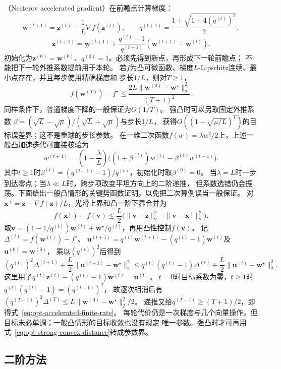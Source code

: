 （Nesterov accelerated gradient）在前瞻点计算梯度：
\[
 \bm w^{(t+1)}=\bm z^{(t)}-\frac1L\nabla f(\bm z^{(t)}),\qquad
 q^{(t+1)}=\frac{1+\sqrt{1+4(q^{(t)})^2}}2,
\]
\[
 \bm z^{(t+1)}=\bm w^{(t+1)}
 +\frac{q^{(t)}-1}{q^{(t+1)}}(\bm w^{(t+1)}-\bm w^{(t)}).
\]
初始化为$\bm z^{(0)}=\bm w^{(0)}$、$q^{(0)}=1$。必须先得到新点，再形成下一轮前瞻点；
不能把下一轮外推系数提前用于本轮。
若$f$为凸可微函数、梯度$L$-Lipschitz连续、最小点存在，并且每步使用精确梯度和
步长$1/L$，则对$T\geq1$，
\begin{equation}
 f(\bm w^{(T)})-f^\star
 \leq\frac{2L\|\bm w^{(0)}-\bm w^\star\|_2^2}{(T+1)^2}.
 \label{eq:opt-accelerated-finite-rate}
\end{equation}
同样条件下，普通梯度下降的一般保证为$O(1/T)$。
强凸时可以另取固定外推系数
$\beta=(\sqrt L-\sqrt\mu)/(\sqrt L+\sqrt\mu)$与步长$1/L$，
获得$O((1-\sqrt{\mu/L})^T)$的目标误差界；这不是重球的步长参数。
在一维二次函数$f(w)=\lambda w^2/2$上，上述一般凸加速迭代可直接核验为
\[
  w^{(t+1)}
  =\left(1-\frac{\lambda}{L}\right)
  \bigl((1+\beta^{(t)})w^{(t)}-\beta^{(t)} w^{(t-1)}\bigr).
\]
其中$t\geq1$时$\beta^{(t)}=(q^{(t-1)}-1)/q^{(t)}$，初始化时取$\beta^{(0)}=0$。
当$\lambda=L$时一步到达零点；当$\lambda\ll L$时，跨步项改变平坦方向上的二阶递推，
但系数选错仍会振荡。下面给出一般凸情形的关键势函数证明，以免把二次算例误当一般保证。
对$\bm x^+=\bm z-\nabla f(\bm z)/L$，光滑上界和凸一阶下界合并为
\[
 f(\bm x^+)-f(\bm v)
 \leq\frac L2\bigl(\|\bm v-\bm z\|_2^2-\|\bm v-\bm x^+\|_2^2\bigr).
\]
取$\bm v=(1-1/q^{(t)})\bm w^{(t)}+\bm w^\star/q^{(t)}$，再用凸性控制$f(\bm v)$。
记$\Delta^{(t)}=f(\bm w^{(t)})-f^\star$、
$\bm u^{(t+1)}=q^{(t)}\bm w^{(t+1)}-(q^{(t)}-1)\bm w^{(t)}$及$\bm u^{(0)}=\bm w^{(0)}$，
乘以$(q^{(t)})^2$后得到
\[
 (q^{(t)})^2\Delta^{(t+1)}+\frac L2\|\bm u^{(t+1)}-\bm w^\star\|_2^2
 \leq q^{(t)}(q^{(t)}-1)\Delta^{(t)}+\frac L2\|\bm u^{(t)}-\bm w^\star\|_2^2.
\]
这里用了$q^{(t)}\bm z^{(t)}-(q^{(t)}-1)\bm w^{(t)}=\bm u^{(t)}$。
$t=0$时目标系数为零，$t\geq1$时$q^{(t)}(q^{(t)}-1)=(q^{(t-1)})^2$，
故逐次相消后有$(q^{(T-1)})^2\Delta^{(T)}\leq L\|\bm w^{(0)}-\bm w^\star\|_2^2/2$。
递推又给$q^{(T-1)}\geq(T+1)/2$，即得式~\eqref{eq:opt-accelerated-finite-rate}。
每轮代价仍是一次梯度与几个向量操作，但目标未必单调；一般凸情形的目标收敛也没有规定
唯一参数。强凸时才可再用式~\eqref{eq:opt-strong-convex-distance}转成参数界。

\subsection{二阶方法}
\label{sec:opt-second-order-methods}

